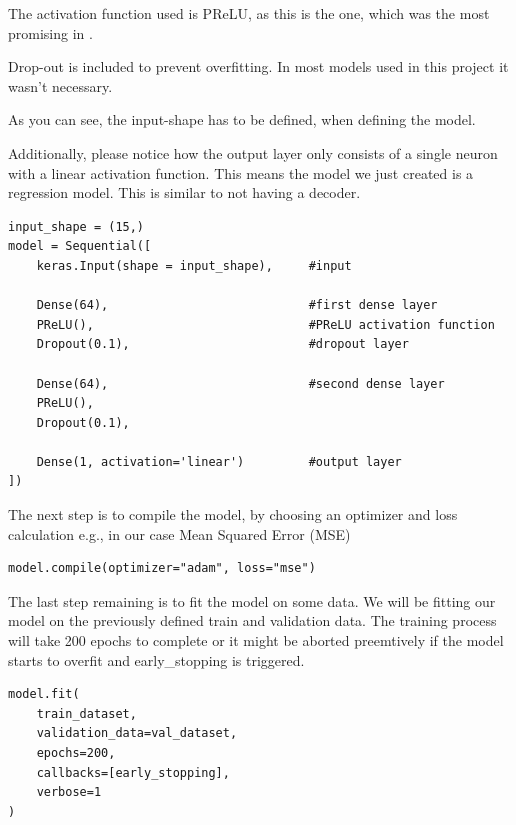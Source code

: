 \documentclass{article}
\begin{document}
The activation function used is PReLU, as this is the one, which was the  
most promising in \cite{trask2018neuralarithmeticlogicunits}. 

Drop-out is included to prevent overfitting. In most models used in this 
project it wasn't necessary.

As you can see, the input-shape has to be defined, when defining the model.

Additionally, please notice how the output layer only consists of a single 
neuron with a linear activation function. This means the model we just 
created is a regression model. This is similar to not having a decoder.
\begin{Verbatim}
input_shape = (15,)
model = Sequential([
    keras.Input(shape = input_shape),     #input

    Dense(64),                            #first dense layer
    PReLU(),                              #PReLU activation function
    Dropout(0.1),                         #dropout layer

    Dense(64),                            #second dense layer
    PReLU(),                                
    Dropout(0.1),                           

    Dense(1, activation='linear')         #output layer
])
\end{Verbatim}

The next step is to compile the model, by choosing an optimizer and loss 
calculation e.g., in our case Mean Squared Error (MSE)
\begin{Verbatim}
model.compile(optimizer="adam", loss="mse")
\end{Verbatim}

The last step remaining is to fit the model on some data. We will be 
fitting our model on the previously defined train and validation data. 
The training process will take 200 epochs to complete or it might be aborted
preemtively if the model starts to overfit and early\_stopping is triggered.

\begin{Verbatim}
model.fit(
    train_dataset,
    validation_data=val_dataset,
    epochs=200,
    callbacks=[early_stopping],
    verbose=1
)
\end{Verbatim}
\end{document}
